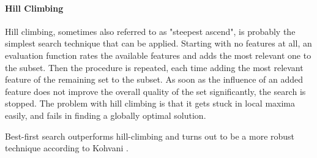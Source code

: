 \paragraph{Hill Climbing}
\label{par:methods.flat.wrapper.hill_climbing}


Hill climbing, sometimes also referred to as "steepest ascend", is probably the
simplest search technique that can  be applied. Starting with no features at
all, an evaluation function rates the  available features and adds the most
relevant one to the subset. Then the  procedure is repeated, each time adding
the most relevant feature of the  remaining set to the subset. As soon as the
influence of an added feature does  not improve the overall quality of the set
significantly, the search is stopped.  The problem with hill climbing is that it
gets stuck in local maxima easily,  and fails in finding a globally optimal
solution.  \cite{Kohavi:97}

Best-first search outperforms hill-climbing and turns out to be a more robust
technique according to Kohvani  \cite{Kohavi:97}.
